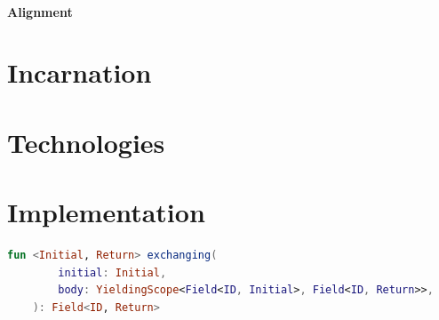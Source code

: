 \paragraph{Alignment}

\section{Incarnation}
\label{sec:incarnation}

\section{Technologies}
\label{sec:technologies}

\section{Implementation}
\label{sec:implementation}




\begin{lstlisting}[language=kt,label={lst:exchanging}]
fun <Initial, Return> exchanging(
        initial: Initial,
        body: YieldingScope<Field<ID, Initial>, Field<ID, Return>>,
    ): Field<ID, Return>
\end{lstlisting}

